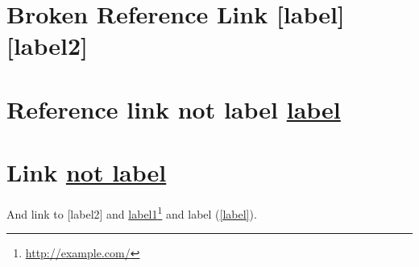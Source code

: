 \section{Broken Reference Link [label][label2]}
\label{brokenreferencelinklabellabel2}

\section{Reference link not label \href{http://example.com/}{label}}
\label{referencelinknotlabellabellabel1}

\section{Link \href{http://example.net/}{not label}}
\label{linknotlabel}

And link to [label2] and \href{http://example.com/}{label1}\footnote{\href{http://example.com/}{http:/\slash example.com\slash }} and label (\autoref{label}).




